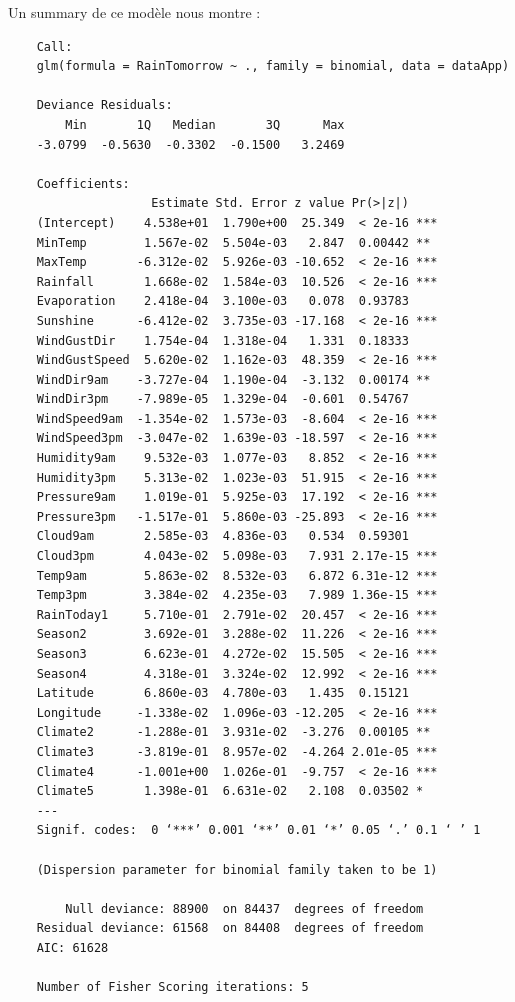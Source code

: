 \documentclass{article}
\begin{document}
Un summary de ce modèle nous montre : 
\begin{verbatim}
    Call:
    glm(formula = RainTomorrow ~ ., family = binomial, data = dataApp)
    
    Deviance Residuals: 
        Min       1Q   Median       3Q      Max  
    -3.0799  -0.5630  -0.3302  -0.1500   3.2469  
    
    Coefficients:
                    Estimate Std. Error z value Pr(>|z|)    
    (Intercept)    4.538e+01  1.790e+00  25.349  < 2e-16 ***
    MinTemp        1.567e-02  5.504e-03   2.847  0.00442 ** 
    MaxTemp       -6.312e-02  5.926e-03 -10.652  < 2e-16 ***
    Rainfall       1.668e-02  1.584e-03  10.526  < 2e-16 ***
    Evaporation    2.418e-04  3.100e-03   0.078  0.93783    
    Sunshine      -6.412e-02  3.735e-03 -17.168  < 2e-16 ***
    WindGustDir    1.754e-04  1.318e-04   1.331  0.18333    
    WindGustSpeed  5.620e-02  1.162e-03  48.359  < 2e-16 ***
    WindDir9am    -3.727e-04  1.190e-04  -3.132  0.00174 ** 
    WindDir3pm    -7.989e-05  1.329e-04  -0.601  0.54767    
    WindSpeed9am  -1.354e-02  1.573e-03  -8.604  < 2e-16 ***
    WindSpeed3pm  -3.047e-02  1.639e-03 -18.597  < 2e-16 ***
    Humidity9am    9.532e-03  1.077e-03   8.852  < 2e-16 ***
    Humidity3pm    5.313e-02  1.023e-03  51.915  < 2e-16 ***
    Pressure9am    1.019e-01  5.925e-03  17.192  < 2e-16 ***
    Pressure3pm   -1.517e-01  5.860e-03 -25.893  < 2e-16 ***
    Cloud9am       2.585e-03  4.836e-03   0.534  0.59301    
    Cloud3pm       4.043e-02  5.098e-03   7.931 2.17e-15 ***
    Temp9am        5.863e-02  8.532e-03   6.872 6.31e-12 ***
    Temp3pm        3.384e-02  4.235e-03   7.989 1.36e-15 ***
    RainToday1     5.710e-01  2.791e-02  20.457  < 2e-16 ***
    Season2        3.692e-01  3.288e-02  11.226  < 2e-16 ***
    Season3        6.623e-01  4.272e-02  15.505  < 2e-16 ***
    Season4        4.318e-01  3.324e-02  12.992  < 2e-16 ***
    Latitude       6.860e-03  4.780e-03   1.435  0.15121    
    Longitude     -1.338e-02  1.096e-03 -12.205  < 2e-16 ***
    Climate2      -1.288e-01  3.931e-02  -3.276  0.00105 ** 
    Climate3      -3.819e-01  8.957e-02  -4.264 2.01e-05 ***
    Climate4      -1.001e+00  1.026e-01  -9.757  < 2e-16 ***
    Climate5       1.398e-01  6.631e-02   2.108  0.03502 *  
    ---
    Signif. codes:  0 ‘***’ 0.001 ‘**’ 0.01 ‘*’ 0.05 ‘.’ 0.1 ‘ ’ 1
    
    (Dispersion parameter for binomial family taken to be 1)
    
        Null deviance: 88900  on 84437  degrees of freedom
    Residual deviance: 61568  on 84408  degrees of freedom
    AIC: 61628
    
    Number of Fisher Scoring iterations: 5
\end{verbatim}
\end{document}
